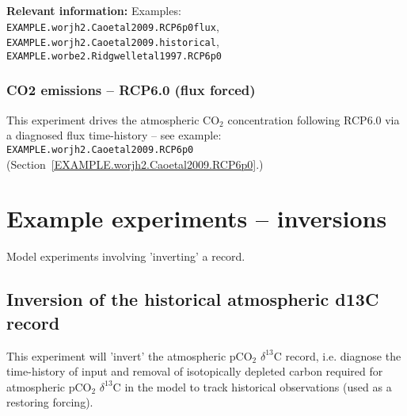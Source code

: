 \documentclass[10pt,twoside]{article}
\begin{document}
\noindent \textbf{Relevant information:} Examples:
\\ \texttt{EXAMPLE.worjh2.Caoetal2009.RCP6p0flux}, 
\\ \texttt{EXAMPLE.worjh2.Caoetal2009.historical}, 
\\ \texttt{EXAMPLE.worbe2.Ridgwelletal1997.RCP6p0}


\subsubsection{CO2 emissions -- RCP6.0 (flux forced)}\label{EXAMPLE.worjh2.Caoetal2009.RCP6p0flux}

This experiment drives the atmospheric CO$_{2}$ concentration following RCP6.0 via a diagnosed flux time-history -- see example:
\texttt{EXAMPLE.worjh2.Caoetal2009.RCP6p0} (Section~\ref{EXAMPLE.worjh2.Caoetal2009.RCP6p0}.)


\newpage
\section{Example experiments -- \textbf{inversions}}\label{example_experiments_inversions}

Model experiments involving 'inverting' a record.


\subsection{Inversion of the historical atmospheric d13C record}\label{EXAMPLE.worjh2.PO4.INVERSION}

This experiment will 'invert' the atmospheric pCO$_{2}$ $\delta^{13}$C record, i.e. diagnose the time-history of input and removal of isotopically depleted carbon required for atmospheric pCO$_{2}$ $\delta^{13}$C in the model to track historical observations (used as a restoring forcing).
\end{document}
